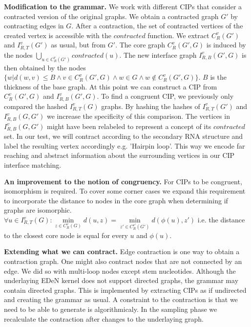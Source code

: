 \documentclass{article}
\begin{document}
\textbf{Modification to the grammar.}
We work with different CIPs that consider a contracted version
of the original graphs. We obtain a contracted graph $G'$ by contracting edges
in $G$. After a contraction, the set of contracted vertices of the 
created vertex is accessible with the $contracted$ function.
We extract $C_{R}^v(G')$ and $I_{R,T}^v(G')$ as usual, but from $G'$. 
The core graph $C_{R}^v(G',G)$ is induced by the nodes 
$\bigcup\limits_{u \in C_R^v(G')} contracted(u)$.
The new interface graph $I_{R,B}^v(G',G)$ is then obtained by the nodes 
$\{ w | d(w,v) \leq B \wedge v\in C_R^v(G',G) \wedge w \in G \wedge w 
\notin C_R^v(G',G) \}$.  $B$ is the thickness of the base graph. 
At this point we can construct a CIP from $C_R^v(G',G)$ and $I_{R,B}^v(G',G)$. 
To find a congruent CIP, we previously only compared the hashed $I_{R,T}^v(G)$ 
graphs. By hashing the hashes of $I_{R,T}^v(G')$ and $I_{R,B}^v(G,G')$ we 
increase the specificity of this comparison. The vertices in $I_{R,B}^v(G,G')$ 
might have been relabeled to represent a concept of its $contracted$ set. In 
our test, we will contract according to the 
secondary RNA structure and label the resulting vertex accordingly e.g.
'Hairpin loop'. This way we encode far reaching and abstract 
information about the surrounding vertices in our CIP interface matching.



\textbf{An improvement to the notion of congruency.}
For CIPs to be congruent, isomorphism is required. 
To cover some corner cases we expand this requirement to incorporate
the distance to nodes in the core graph when determining if graphs are 
isomorphic.
$\forall u \in I_{R,T}^v(G) : 
\underset{z \in  C_{R}^v(G)}{\min} d(u,z) = 
\underset{z' \in  C_{R}^{v'}(G')}{\min} d(\phi(u),z') $ i.e. the distance 
to the closest core node is equal for every
$u$ and $\phi(u)$.

\textbf{Extending what we can contract.}
Edge contraction is one way to obtain a contraction graph. 
One might also contract nodes that are not connected by an edge.
We did so with multi-loop nodes except stem nucleotides.
Although the underlaying EDeN kernel does not support directed graphs,
the grammar may contain directed graphs. This is implemented by extracting
CIPs as if undirected and creating the grammar as usual.
A constraint to the contraction is that we need to be able to 
generate is algorithmicaly. In the sampling phase we recalculate 
the contraction after changes to the underlaying graph.
\end{document}
